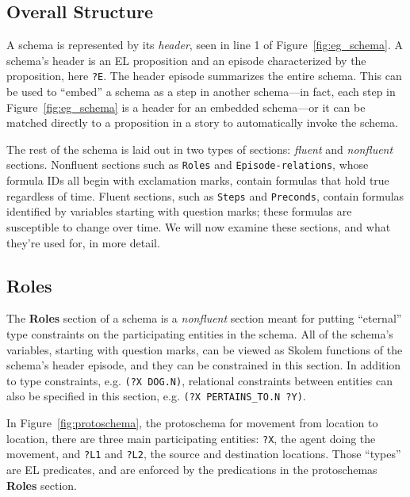 \subsection{Overall Structure}
A schema is represented by its \textit{header}, seen in line 1 of Figure~\ref{fig:eg_schema}. A schema's header is an EL proposition and an episode characterized by the proposition, here \texttt{?E}. The header episode summarizes the entire schema. This can be used to ``embed'' a schema as a step in another schema---in fact, each step in Figure~\ref{fig:eg_schema} is a header for an embedded schema---or it can be matched directly to a proposition in a story to automatically invoke the schema.

The rest of the schema is laid out in two types of sections: \textit{fluent} and \textit{nonfluent} sections. Nonfluent sections such as \texttt{Roles} and \texttt{Episode-relations}, whose formula IDs all begin with exclamation marks, contain formulas that hold true regardless of time. Fluent sections, such as \texttt{Steps} and \texttt{Preconds}, contain formulas identified by variables starting with question marks; these formulas are susceptible to change over time. We will now examine these sections, and what they're used for, in more detail.

\subsection{Roles}
The \textbf{Roles} section of a schema is a \textit{nonfluent} section meant for putting ``eternal'' type constraints on the participating entities in the schema. All of the schema's variables, starting with question marks, can be viewed as Skolem functions of the schema's header episode, and they can be constrained in this section. In addition to type constraints, e.g. \texttt{(?X DOG.N)}, relational constraints between entities can also be specified in this section, e.g. \texttt{(?X PERTAINS\_TO.N ?Y)}.

In Figure~\ref{fig:protoschema}, the protoschema for movement from location to location, there are three main participating entities: \texttt{?X}, the agent doing the movement, and \texttt{?L1} and \texttt{?L2}, the source and destination locations. Those ``types'' are EL predicates, and are enforced by the predications in the protoschemas \textbf{Roles} section.

